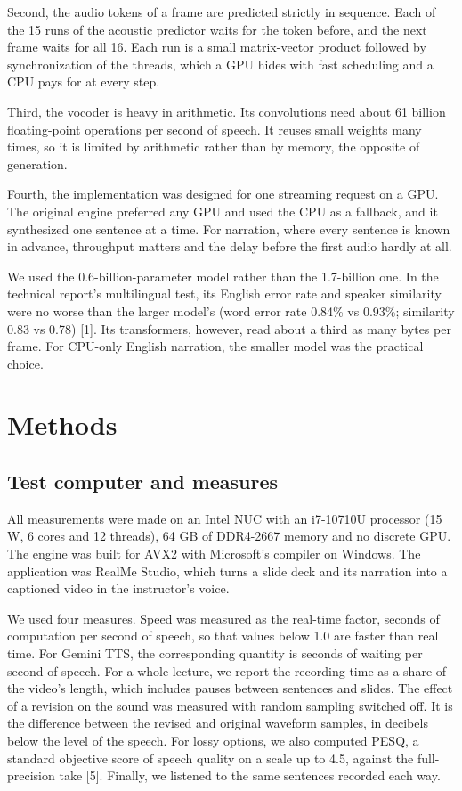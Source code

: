 \documentclass[11pt]{article}
\begin{document}
Second, the audio tokens of a frame are predicted strictly in sequence.
Each of the 15 runs of the acoustic predictor waits for the token
before, and the next frame waits for all 16. Each run is a small
matrix-vector product followed by synchronization of the threads, which
a GPU hides with fast scheduling and a CPU pays for at every step.

Third, the vocoder is heavy in arithmetic. Its convolutions need about
61 billion floating-point operations per second of speech. It reuses
small weights many times, so it is limited by arithmetic rather than by
memory, the opposite of generation.

Fourth, the implementation was designed for one streaming request on a
GPU. The original engine preferred any GPU and used the CPU as a
fallback, and it synthesized one sentence at a time. For narration,
where every sentence is known in advance, throughput matters and the
delay before the first audio hardly at all.

We used the 0.6-billion-parameter model rather than the 1.7-billion one.
In the technical report's multilingual test, its English error rate and
speaker similarity were no worse than the larger model's (word error
rate 0.84\% vs 0.93\%; similarity 0.83 vs 0.78) {[}1{]}. Its
transformers, however, read about a third as many bytes per frame. For
CPU-only English narration, the smaller model was the practical choice.

\hypertarget{methods}{%
\section{Methods}\label{methods}}

\hypertarget{test-computer-and-measures}{%
\subsection{Test computer and
measures}\label{test-computer-and-measures}}

All measurements were made on an Intel NUC with an i7-10710U processor
(15 W, 6 cores and 12 threads), 64 GB of DDR4-2667 memory and no
discrete GPU. The engine was built for AVX2 with Microsoft's compiler on
Windows. The application was RealMe Studio, which turns a slide deck and
its narration into a captioned video in the instructor's voice.

We used four measures. Speed was measured as the real-time factor,
seconds of computation per second of speech, so that values below 1.0
are faster than real time. For Gemini TTS, the corresponding quantity is
seconds of waiting per second of speech. For a whole lecture, we report
the recording time as a share of the video's length, which includes
pauses between sentences and slides. The effect of a revision on the
sound was measured with random sampling switched off. It is the
difference between the revised and original waveform samples, in
decibels below the level of the speech. For lossy options, we also
computed PESQ, a standard objective score of speech quality on a scale
up to 4.5, against the full-precision take {[}5{]}. Finally, we listened
to the same sentences recorded each way.
\end{document}
